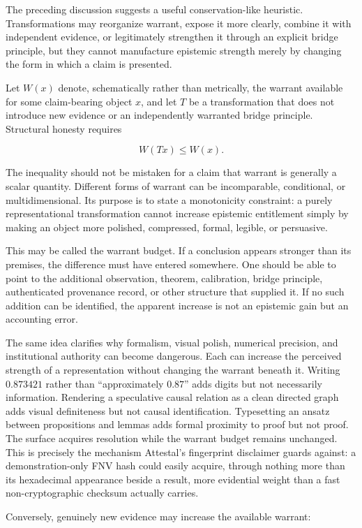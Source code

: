\documentclass[11pt]{article}
\begin{document}
The preceding discussion suggests a useful conservation-like heuristic. Transformations may reorganize warrant, expose it more clearly, combine it with independent evidence, or legitimately strengthen it through an explicit bridge principle, but they cannot manufacture epistemic strength merely by changing the form in which a claim is presented.

Let $W(x)$ denote, schematically rather than metrically, the warrant available for some claim-bearing object $x$, and let $T$ be a transformation that does not introduce new evidence or an independently warranted bridge principle. Structural honesty requires

\[
W(Tx) \leq W(x).
\]

The inequality should not be mistaken for a claim that warrant is generally a scalar quantity. Different forms of warrant can be incomparable, conditional, or multidimensional. Its purpose is to state a monotonicity constraint: a purely representational transformation cannot increase epistemic entitlement simply by making an object more polished, compressed, formal, legible, or persuasive.

This may be called the warrant budget. If a conclusion appears stronger than its premises, the difference must have entered somewhere. One should be able to point to the additional observation, theorem, calibration, bridge principle, authenticated provenance record, or other structure that supplied it. If no such addition can be identified, the apparent increase is not an epistemic gain but an accounting error.

The same idea clarifies why formalism, visual polish, numerical precision, and institutional authority can become dangerous. Each can increase the perceived strength of a representation without changing the warrant beneath it. Writing $0.873421$ rather than ``approximately $0.87$'' adds digits but not necessarily information. Rendering a speculative causal relation as a clean directed graph adds visual definiteness but not causal identification. Typesetting an ansatz between propositions and lemmas adds formal proximity to proof but not proof. The surface acquires resolution while the warrant budget remains unchanged. This is precisely the mechanism Attestal's fingerprint disclaimer guards against: a demonstration-only FNV hash could easily acquire, through nothing more than its hexadecimal appearance beside a result, more evidential weight than a fast non-cryptographic checksum actually carries.

Conversely, genuinely new evidence may increase the available warrant:
\end{document}
